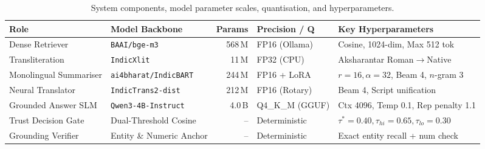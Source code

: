 \begin{table}[t]
\centering
\caption{System components, model parameter scales, quantisation, and hyperparameters.}
\label{tab:models}
\begin{tabular}{llrll}
\toprule
\textbf{Role} & \textbf{Model Backbone} & \textbf{Params} & \textbf{Precision / Q} & \textbf{Key Hyperparameters} \\
\midrule
Dense Retriever & \texttt{BAAI/bge-m3} & 568\,M & FP16 (Ollama) & Cosine, 1024-dim, Max 512 tok \\
Transliteration & \texttt{IndicXlit} & 11\,M & FP32 (CPU) & Aksharantar Roman$\to$Native \\
Monolingual Summariser & \texttt{ai4bharat/IndicBART} & 244\,M & FP16 + LoRA & $r=16, \alpha=32$, Beam 4, $n$-gram 3 \\
Neural Translator & \texttt{IndicTrans2-dist} & 212\,M & FP16 (Rotary) & Beam 4, Script unification \\
Grounded Answer SLM & \texttt{Qwen3-4B-Instruct} & 4.0\,B & Q4\_K\_M (GGUF) & Ctx 4096, Temp 0.1, Rep penalty 1.1 \\
Trust Decision Gate & Dual-Threshold Cosine & -- & Deterministic & $\tau^*=0.40, \tau_{hi}=0.65, \tau_{lo}=0.30$ \\
Grounding Verifier & Entity \& Numeric Anchor & -- & Deterministic & Exact entity recall + num check \\
\bottomrule
\end{tabular}
\end{table}